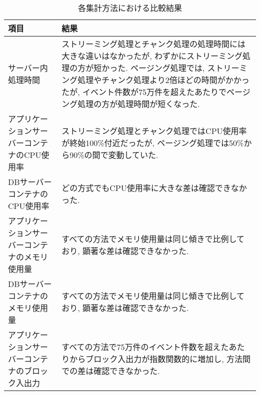 \documentclass[../../../main]{subfiles}
\begin{document}
    \begin{table}[H]
        \centering
        \caption{各集計方法における比較結果}
        \label{tab:result-comparison}
        \begin{tabular}{|p{4cm}|p{10cm}|}
            \hline
            \textbf{項目}              & \textbf{結果}                                                                                                                                                                                                          \\ \hline
            サーバー内処理時間                & ストリーミング処理とチャンク処理の処理時間には大きな違いはなかったが, わずかにストリーミング処理の方が短かった. ページング処理では, ストリーミング処理やチャンク処理より2倍ほどの時間がかかったが, イベント件数が75万件を超えたあたりでページング処理の方が処理時間が短くなった.  \\ \hline
            アプリケーションサーバーコンテナのCPU使用率  & ストリーミング処理とチャンク処理ではCPU使用率が終始100\%付近だったが, ページング処理では50\%から90\%の間で変動していた.                                                                                                                                                    \\ \hline
            DBサーバーコンテナのCPU使用率        & どの方式でもCPU使用率に大きな差は確認できなかった.                                                                                                                                                                                                    \\ \hline
            アプリケーションサーバーコンテナのメモリ使用量  & すべての方法でメモリ使用量は同じ傾きで比例しており, 顕著な差は確認できなかった.                                                                                                                                                                                    \\ \hline
            DBサーバーコンテナのメモリ使用量        & すべての方法でメモリ使用量は同じ傾きで比例しており, 顕著な差は確認できなかった.                                                                                                                                                                                    \\ \hline
            アプリケーションサーバーコンテナのブロック入出力 & すべての方法で75万件のイベント件数を超えたあたりからブロック入出力が指数関数的に増加し, 方法間での差は確認できなかった.                                                                                                                                                                        \\ \hline

\end{tabular}
\end{table}
\end{document}
